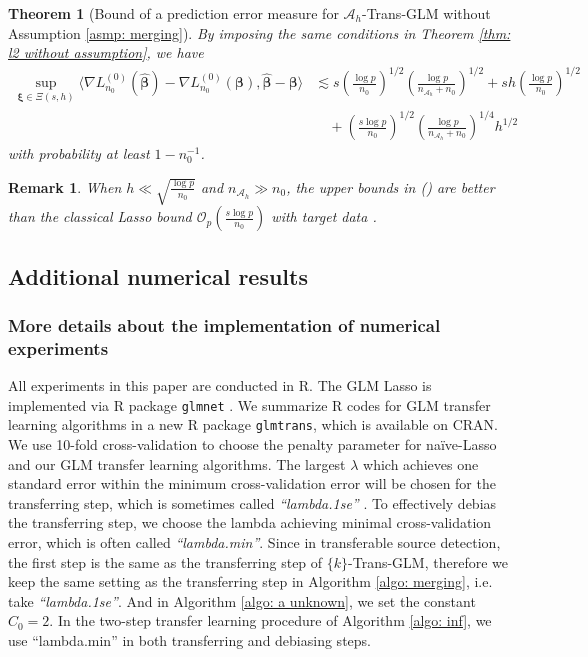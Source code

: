 \documentclass[12pt]{article}
\newcommand*{\rom}[1]{\romannumeral #1}
\newcommand{\bxi}{\bm{\xi}}
\newcommand{\bbeta}{\bm{\beta}}
\newcommand{\hbeta}{\hat{\bm{\beta}}}
\newcommand{\mah}{\mathcal{A}_h}
\newcommand{\nah}{n_{\mathcal{A}_h}}
\newcommand{\<}{\langle}
\renewcommand{\>}{\rangle}
\newtheorem{theorem}{Theorem}
\newtheorem{remark}{Remark}
\begin{document}
\begin{theorem}[Bound of a prediction error measure for $\mah$-Trans-GLM without Assumption \ref{asmp: merging}]\label{thm: prediction error without assumption}
By imposing the same conditions in Theorem \ref{thm: l2 without assumption}, we have	\begin{align}
		\sup_{\bxi \in \Xi(s, h)}\<\nabla L^{(0)}_{n_0}(\hbeta) -\nabla L^{(0)}_{n_0}(\bbeta), \hbeta - \bbeta\> 
		&\lesssim s\left(\frac{\log p}{n_0}\right)^{1/2}\left(\frac{\log p}{\nah+n_0}\right)^{1/2} + sh\left(\frac{\log p}{n_0}\right)^{1/2}\\
		&\quad + \left(\frac{s\log p}{n_0}\right)^{1/2}\left(\frac{\log p}{\nah+n_0}\right)^{1/4}h^{1/2} \label{eq: prediction error bound 1 with asmp}
	\end{align}
	with probability at least $1-n_0^{-1}$.
\end{theorem}

\begin{remark}
	When $h \ll \sqrt{\frac{\log p}{n_0}}$ and $\nah \gg n_0$, the upper bounds in (\rom{1})  are better than the classical Lasso bound $\mathcal{O}_p\left(\frac{s\log p}{n_0}\right)$ with target data \citep{loh2015regularized}. 
\end{remark}


\subsection{Additional numerical results}



\subsubsection{More details about the implementation of numerical experiments}\label{subsubsec: implementation supp}
All experiments in this paper are conducted in R. The GLM Lasso is implemented via R package \texttt{glmnet} \citep{friedman2010regularization}. We summarize R codes for GLM transfer learning algorithms in a new R package \texttt{glmtrans}, which is available on CRAN. We use 10-fold cross-validation to choose the penalty parameter for na\"ive-Lasso and our GLM transfer learning algorithms. The largest $\lambda$ which achieves one standard error within the minimum cross-validation error will be chosen for the transferring step, which is sometimes called \textit{``lambda.1se''} \citep{friedman2010regularization}. To effectively debias the transferring step, we choose the lambda achieving minimal cross-validation error, which is often called \textit{``lambda.min''}. Since in transferable source detection, the first step is the same as the transferring step of $\{k\}$-Trans-GLM, therefore we keep the same setting as the transferring step in Algorithm \ref{algo: merging}, i.e. take \textit{``lambda.1se''}. And in Algorithm \ref{algo: a unknown}, we set the constant $C_0 = 2$. In the two-step transfer learning procedure of Algorithm \ref{algo: inf}, we use ``lambda.min'' in both transferring and debiasing steps.
\end{document}

